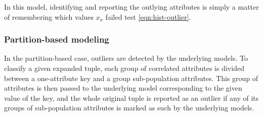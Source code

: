 In this model, identifying and reporting the outlying attributes is simply a matter of remembering which values $x_a$ failed test \eqref{eqn:hist-outlier}.

\subsubsection{Partition-based modeling}
In the partition-based case, outliers are detected by the underlying models. To classify a given expanded tuple, each group of correlated attributes is divided between a one-attribute key and a group sub-population attributes. This group of attributes is then passed to the underlying model corresponding to the given value of the key, and the whole original tuple is reported as an outlier if any of its groups of sub-population attributes is marked as such by the underlying models.
